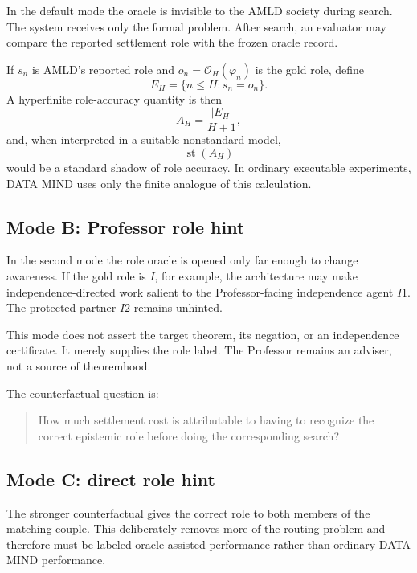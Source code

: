 \documentclass[11pt]{article}
\newcommand{\st}{\operatorname{st}}
\begin{document}
In the default mode the oracle is invisible to the AMLD society during search. The system receives only the formal problem. After search, an evaluator may compare the reported settlement role with the frozen oracle record.

If $s_n$ is AMLD's reported role and $o_n=\mathscr O_H(\varphi_n)$ is the gold role, define
\begin{equation}
E_H=\{n\le H:s_n=o_n\}.
\end{equation}
A hyperfinite role-accuracy quantity is then
\begin{equation}
A_H=\frac{|E_H|}{H+1},
\end{equation}
and, when interpreted in a suitable nonstandard model,
\begin{equation}
\st(A_H)
\end{equation}
would be a standard shadow of role accuracy. In ordinary executable experiments, DATA MIND uses only the finite analogue of this calculation.

\subsection{Mode B: Professor role hint}

In the second mode the role oracle is opened only far enough to change awareness. If the gold role is $I$, for example, the architecture may make independence-directed work salient to the Professor-facing independence agent $I1$. The protected partner $I2$ remains unhinted.

This mode does not assert the target theorem, its negation, or an independence certificate. It merely supplies the role label. The Professor remains an adviser, not a source of theoremhood.

The counterfactual question is:
\begin{quote}
How much settlement cost is attributable to having to recognize the correct epistemic role before doing the corresponding search?
\end{quote}

\subsection{Mode C: direct role hint}

The stronger counterfactual gives the correct role to both members of the matching couple. This deliberately removes more of the routing problem and therefore must be labeled oracle-assisted performance rather than ordinary DATA MIND performance.
\end{document}
